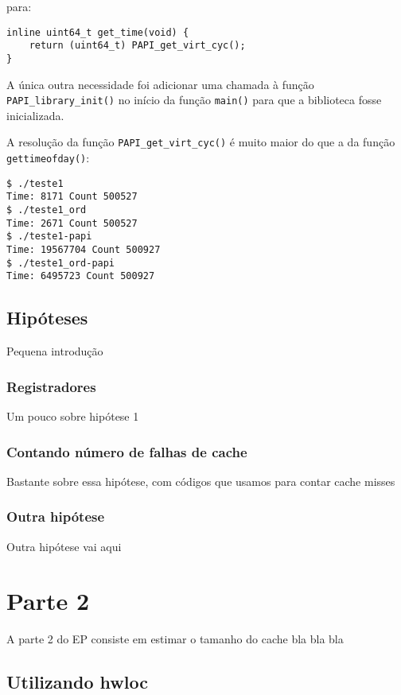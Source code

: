 \documentclass[a4paper,oneside,12pt]{article}
\begin{document}
para:

\begin{verbatim}
inline uint64_t get_time(void) { 
    return (uint64_t) PAPI_get_virt_cyc();
}  
\end{verbatim}

A única outra necessidade foi adicionar uma chamada à função {\tt PAPI\_library\_init()} no início da função {\tt main()} para que a biblioteca fosse inicializada.

A resolução da função {\tt PAPI\_get\_virt\_cyc()} é muito maior do que a da função {\tt gettimeofday()}:

\begin{verbatim}
$ ./teste1
Time: 8171 Count 500527
$ ./teste1_ord
Time: 2671 Count 500527
$ ./teste1-papi
Time: 19567704 Count 500927
$ ./teste1_ord-papi
Time: 6495723 Count 500927
\end{verbatim}

\subsection{Hipóteses}

Pequena introdução %

\subsubsection{Registradores}

Um pouco sobre hipótese 1 %

\subsubsection{Contando número de falhas de cache}

Bastante sobre essa hipótese, com códigos que usamos para contar cache misses %

\subsubsection{Outra hipótese}

Outra hipótese vai aqui %

\section{Parte 2}

A parte 2 do EP consiste em estimar o tamanho do cache bla bla bla %

\subsection{Utilizando hwloc}
\end{document}
